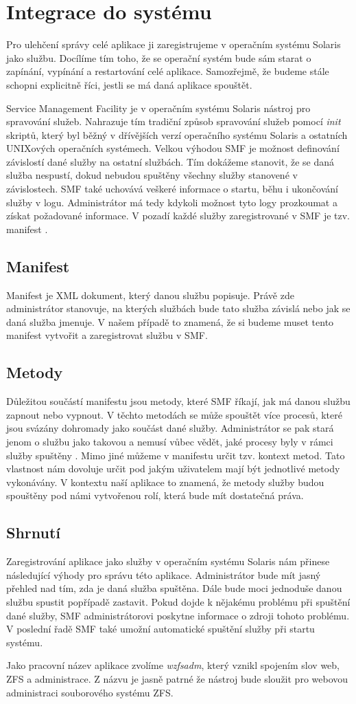 \section{Integrace do systému}
Pro ulehčení správy celé aplikace ji zaregistrujeme v operačním systému Solaris jako službu. Docílíme tím toho, že se operační systém bude sám starat o zapínání, vypínání a restartování celé aplikace. Samozřejmě, že budeme stále schopni explicitně říci, jestli se má daná aplikace spouštět.

Service Management Facility je v operačním systému Solaris nástroj pro spravování služeb. Nahrazuje tím tradiční způsob spravování služeb pomocí \emph{init} skriptů, který byl běžný v dřívějších verzí operačního systému Solaris a ostatních UNIXových operačních systémech. Velkou výhodou SMF je možnost definování závislostí dané služby na ostatní službách. Tím dokážeme stanovit, že se daná služba nespustí, dokud nebudou spuštěny všechny služby stanovené v závislostech. SMF také uchovává veškeré informace o startu, běhu i ukončování služby v logu. Administrátor má tedy kdykoli možnost tyto logy prozkoumat a získat požadované informace. V pozadí každé služby zaregistrované v SMF je tzv. manifest \cite{SMF}.
    \subsection{Manifest}
    Manifest je XML dokument, který danou službu popisuje. Právě zde administrátor stanovuje, na kterých službách bude tato služba závislá nebo jak se daná služba jmenuje. V našem případě to znamená, že si budeme muset tento manifest vytvořit a zaregistrovat službu v SMF.
    \subsection{Metody}
    Důležitou součástí manifestu jsou metody, které SMF říkají, jak má danou službu zapnout nebo vypnout. V těchto metodách se může spouštět více procesů, které jsou svázány dohromady jako součást dané služby. Administrátor se pak stará jenom o službu jako takovou a nemusí vůbec vědět, jaké procesy byly v rámci služby spuštěny \cite{SMF}. Mimo jiné můžeme v manifestu určit tzv. kontext metod. Tato vlastnost nám dovoluje určit pod jakým uživatelem mají být jednotlivé metody vykonávány. V kontextu naší aplikace to znamená, že metody služby budou spouštěny pod námi vytvořenou rolí, která bude mít dostatečná práva.
    \subsection{Shrnutí}
    Zaregistrování aplikace jako služby v operačním systému Solaris nám přinese následující výhody pro správu této aplikace. Administrátor bude mít jasný přehled nad tím, zda je daná služba spuštěna. Dále bude moci jednoduše danou službu spustit popřípadě zastavit. Pokud dojde k nějakému problému při spuštění dané služby, SMF administrátorovi poskytne informace o zdroji tohoto problému. V poslední řadě SMF také umožní automatické spuštění služby při startu systému.

    Jako pracovní název aplikace zvolíme \emph{wzfsadm}, který vznikl spojením slov web, ZFS a administrace. Z názvu je jasně patrné že nástroj bude sloužit pro webovou administraci souborového systému ZFS.


